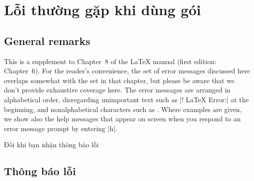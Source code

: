 \chapter{Lỗi thường gặp khi dùng gói }

\section{General remarks}

This is a supplement to Chapter~8 of the \LaTeX{} manual \cite{lamport} (first
edition: Chapter~6). For the reader's convenience, the set of error
messages discussed here overlaps somewhat with the set in that chapter,
but please be aware that we don't provide exhaustive coverage here.
The error messages are arranged in alphabetical order, disregarding
unimportant text such as |! LaTeX Error:| at the beginning, and
nonalphabetical characters such as \qc{\\}. Where examples are given, we
show also the help messages that appear on screen when you respond to an
error message prompt by entering |h|.

\medskip
Đôi khi bạn nhận thông báo lỗi

\section{Thông báo lỗi}


